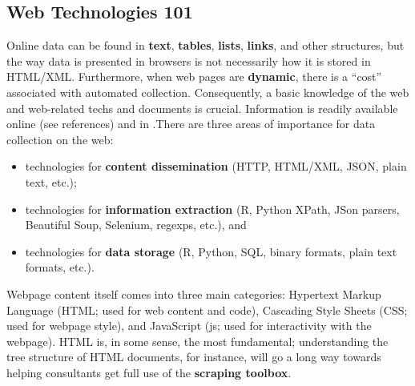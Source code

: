 \subsection{Web Technologies 101}
Online data can be found in \textbf{text}, \textbf{tables}, \textbf{lists}, \textbf{links}, and other structures, but the way data is presented in browsers is not necessarily how it is stored in HTML/XML. Furthermore, when web pages are \textbf{dynamic}, there is a ``cost'' associated with automated collection. Consequently, a basic knowledge of the web and web-related techs and documents is crucial. Information is readily available online (see references) and in  \cite{DC_M,DC_MRMN}.\newpage\noindent There are three areas of importance for data collection on the web:
\begin{itemize}[noitemsep]
\item technologies for \textbf{content dissemination} (HTTP, HTML/XML, JSON, plain text, etc.);
\item technologies for \textbf{information extraction} (R, Python XPath, JSon parsers, Beautiful Soup, Selenium, regexps, etc.), and 
\item technologies for \textbf{data storage} (R, Python, SQL, binary formats, plain text formats, etc.).
\end{itemize}
Webpage content itself comes into three main categories: Hypertext Markup Language (HTML; used for web content and code), Cascading Style Sheets (CSS; used for webpage style), and 
JavaScript (js; used for interactivity with the webpage). HTML is, in some sense, the most fundamental; understanding the tree structure of HTML documents, for instance, will go a long way towards helping consultants get full use of the \textbf{scraping toolbox}. 
